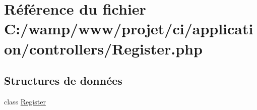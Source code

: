 \hypertarget{_register_8php}{}\section{Référence du fichier C\+:/wamp/www/projet/ci/application/controllers/\+Register.php}
\label{_register_8php}
\subsection*{Structures de données}
\begin{DoxyCompactItemize}
\item 
class \mbox{\hyperlink{class_register}{Register}}
\end{DoxyCompactItemize}
